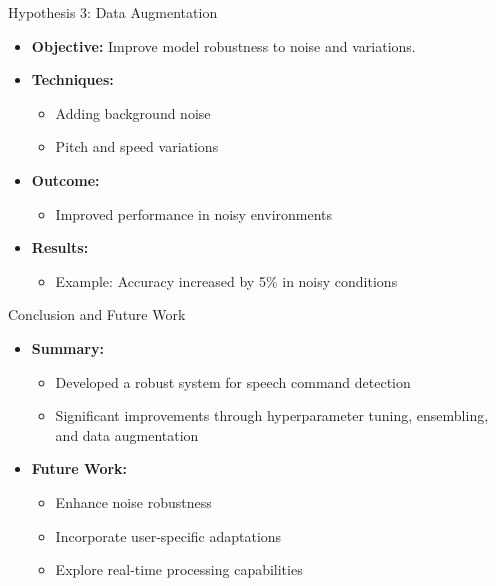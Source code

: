 \documentclass{beamer}
\begin{document}
\begin{frame}{Hypothesis 3: Data Augmentation}
  \begin{itemize}
    \item \textbf{Objective:} Improve model robustness to noise and variations.
    \item \textbf{Techniques:}
      \begin{itemize}
        \item Adding background noise
        \item Pitch and speed variations
      \end{itemize}
    \item \textbf{Outcome:}
      \begin{itemize}
        \item Improved performance in noisy environments
      \end{itemize}
    \item \textbf{Results:}
      \begin{itemize}
        \item Example: Accuracy increased by 5\% in noisy conditions
      \end{itemize}
  \end{itemize}
\end{frame}

\begin{frame}{Conclusion and Future Work}
  \begin{itemize}
    \item \textbf{Summary:}
      \begin{itemize}
        \item Developed a robust system for speech command detection
        \item Significant improvements through hyperparameter tuning, ensembling, and data augmentation
      \end{itemize}
    \item \textbf{Future Work:}
      \begin{itemize}
        \item Enhance noise robustness
        \item Incorporate user-specific adaptations
        \item Explore real-time processing capabilities
      \end{itemize}
  \end{itemize}
\end{frame}
\end{document}

